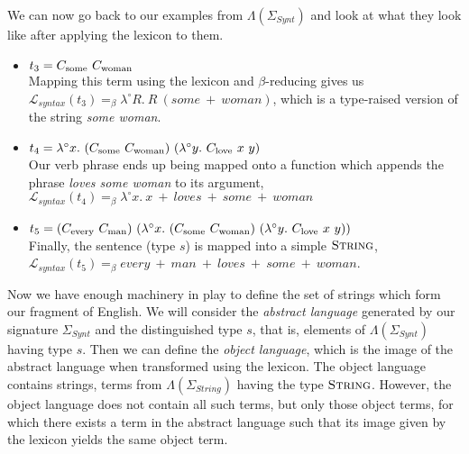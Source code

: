 \documentclass{article}
\begin{document}
We can now go back to our examples from $\Lambda(\Sigma_{Synt})$ and
look at what they look like after applying the lexicon to them.
\begin{itemize}
\item $t_3 = \synt{some}\ \synt{woman}$ \\ Mapping this term using the
  lexicon and $\beta$-reducing gives us $\mathcal{L}_{syntax}(t_3)
  =_{\beta} \lambda^{\circ} R.\ R\ (some\ +\ woman)$, which is a
  type-raised version of the string \emph{some woman}.
\item $t_4 = \lambda^{\circ}
  x.\ (C_{\textrm{some}}\ C_{\textrm{woman}})\ (\lambda^{\circ}
  y.\ C_{\textrm{love}}\ x\ y)$ \\ Our verb phrase ends up being mapped onto
  a function which appends the phrase \emph{loves some woman} to its
  argument, $\mathcal{L}_{syntax}(t_4) =_{\beta} \lambda^{\circ}
  x.\ x\ +\ loves\ +\ some\ +\ woman$
\item $t_5 = (\synt{every}\ \synt{man})\ (\lambda^{\circ}
  x.\ (\synt{some}\ \synt{woman})\ (\lambda^{\circ}
  y.\ \synt{love}\ x\ y))$ \\ Finally, the sentence (type $s$) is mapped
  into a simple $\textsc{String}$, $\mathcal{L}_{syntax}(t_5) =_{\beta}
  every\ +\ man\ +\ loves\ +\ some\ +\ woman$.
\end{itemize}

Now we have enough machinery in play to define the set of strings which
form our fragment of English. We will consider the \emph{abstract
  language} generated by our signature $\Sigma_{Synt}$ and the
distinguished type $s$, that is, elements of $\Lambda(\Sigma_{Synt})$
having type $s$. Then we can define the \emph{object language}, which is
the image of the abstract language when transformed using the
lexicon. The object language contains strings, terms from
$\Lambda(\Sigma_{String})$ having the type $\textsc{String}$. However,
the object language does not contain all such terms, but only those
object terms, for which there exists a term in the abstract language
such that its image given by the lexicon yields the same object term.



\end{document}
